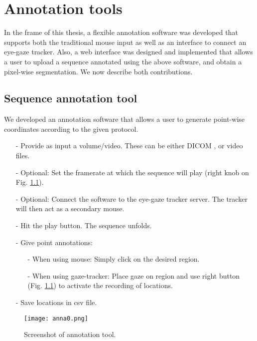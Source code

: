
\chapter{Annotation tools}
In the frame of this thesis, a flexible annotation software was developed that supports both the traditional mouse input as well as an interface to connect an eye-gaze tracker.
Also, a web interface was designed and implemented that allows a user to upload a sequence annotated using the above software, and obtain a pixel-wise segmentation.
We now describe both contributions.

\section{Sequence annotation tool}
\label{sec:anna}

We developed an annotation software that allows a user to generate point-wise coordinates according to the given protocol.

\begin{enumerate}
  \item[-]{Provide as input a volume/video. These can be either DICOM \cite{dicom}, or video files.}
  \item[-]{Optional: Set the framerate at which the sequence will play (right knob on Fig. \ref{fig:anna}).}
  \item[-]{Optional: Connect the software to the eye-gaze tracker server. The tracker will then act as a secondary mouse.}
  \item[-]{Hit the play button. The sequence unfolds.}
  \item[-]{Give point annotations:}
    \begin{itemize}
      \item[-]{When using mouse: Simply click on the desired region.}
      \item[-]{When using gaze-tracker: Place gaze on region and use right button (Fig. \ref{fig:anna}) to activate the recording of locations.}
    \end{itemize}
  \item[-]{Save locations in \gls{csv} file.}
\end{enumerate}

\begin{figure}[!htpb]
  \texttt{[image: anna0.png]}
  \caption{Screenshot of annotation tool. }
  \label{fig:anna}
\end{figure}

